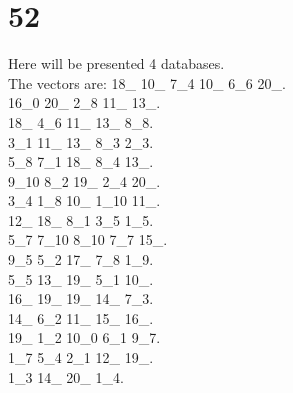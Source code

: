 \chapter{52}
\indent Here will be presented 4 databases.\\
The vectors are:
18\_ 10\_ 7\_4 10\_ 6\_6 20\_.\\16\_0 20\_ 2\_8 11\_ 13\_.\\18\_ 4\_6 11\_ 13\_ 8\_8.\\3\_1 11\_ 13\_ 8\_3 2\_3.\\5\_8 7\_1 18\_ 8\_4 13\_.\\9\_10 8\_2 19\_ 2\_4 20\_.\\3\_4 1\_8 10\_ 1\_10 11\_.\\12\_ 18\_ 8\_1 3\_5 1\_5.\\5\_7 7\_10 8\_10 7\_7 15\_.\\9\_5 5\_2 17\_ 7\_8 1\_9.\\5\_5 13\_ 19\_ 5\_1 10\_.\\16\_ 19\_ 19\_ 14\_ 7\_3.\\14\_ 6\_2 11\_ 15\_ 16\_.\\19\_ 1\_2 10\_0 6\_1 9\_7.\\1\_7 5\_4 2\_1 12\_ 19\_.\\1\_3 14\_ 20\_ 1\_4.\\